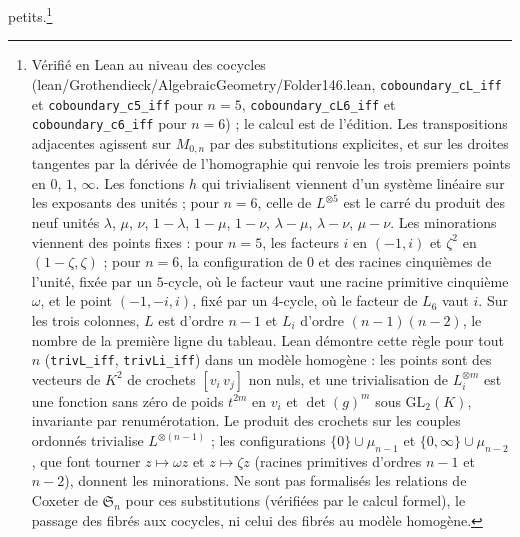 \documentclass[11pt,a4paper]{article}
\begin{document}
petits.\footnote{Vérifié en Lean au niveau des cocycles
(lean/Grothendieck/AlgebraicGeometry/Folder146.lean, \texttt{coboundary\_cL\_iff} et
\texttt{coboundary\_c5\_iff} pour $n = 5$, \texttt{coboundary\_cL6\_iff} et
\texttt{coboundary\_c6\_iff} pour $n = 6$) ; le calcul est de l'édition. Les
transpositions adjacentes agissent sur $M_{0,n}$ par des substitutions
explicites, et sur les droites tangentes par la dérivée de l'homographie qui
renvoie les trois premiers points en $0$, $1$, $\infty$. Les fonctions $h$ qui
trivialisent viennent d'un système linéaire sur les exposants des unités ; pour
$n = 6$, celle de $L^{\otimes 5}$ est le carré du produit des neuf unités
$\lambda$, $\mu$, $\nu$, $1 - \lambda$, $1 - \mu$, $1 - \nu$,
$\lambda - \mu$, $\lambda - \nu$, $\mu - \nu$. Les minorations viennent des
points fixes : pour $n = 5$, les facteurs $i$ en $(-1, i)$ et $\zeta^2$ en
$(1 - \zeta, \zeta)$ ; pour $n = 6$, la configuration de $0$ et des racines
cinquièmes de l'unité, fixée par un $5$-cycle, où le facteur vaut une racine
primitive cinquième $\omega$, et le point $(-1, -i, i)$, fixé par un
$4$-cycle, où le facteur de $L_6$ vaut $i$. Sur les trois colonnes, $L$ est
d'ordre $n - 1$ et $L_i$ d'ordre $(n-1)(n-2)$, le nombre de la première ligne
du tableau. Lean démontre cette règle pour tout $n$
(\texttt{trivL\_iff}, \texttt{trivLi\_iff}) dans un modèle homogène : les
points sont des vecteurs de $K^2$ de crochets $[v_i\,v_j]$ non nuls, et une
trivialisation de $L_i^{\otimes m}$ est une fonction sans zéro de poids
$t^{2m}$ en $v_i$ et $\det(g)^m$ sous $\mathrm{GL}_2(K)$, invariante par
renumérotation. Le produit des crochets sur les couples ordonnés trivialise
$L^{\otimes(n-1)}$ ; les configurations $\{0\} \cup \mu_{n-1}$ et
$\{0, \infty\} \cup \mu_{n-2}$, que font tourner $z \mapsto \omega z$ et
$z \mapsto \zeta z$ (racines primitives d'ordres $n - 1$ et $n - 2$),
donnent les minorations. Ne sont pas formalisés les relations de Coxeter de
$\mathfrak{S}_n$ pour ces substitutions (vérifiées par le calcul formel), le
passage des fibrés aux cocycles, ni celui des fibrés au modèle homogène.}
\end{document}

